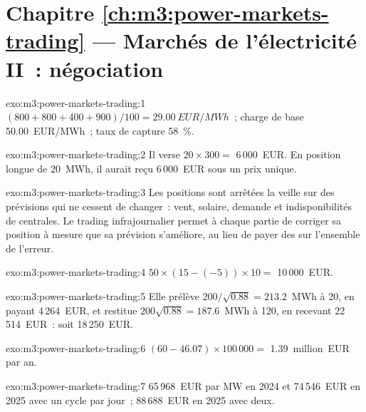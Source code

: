 \section*{Chapitre \ref{ch:m3:power-markets-trading} --- Marchés de l'électricité II~: négociation}

\begin{solution}{exo:m3:power-markets-trading:1}
 $(800 + 800 + 400 + 900)/100 = \qty{29.00}{EUR/MWh}$~; charge de base
\qty{50.00}{EUR/MWh}~; taux de capture 58~\%.
\end{solution}

\begin{solution}{exo:m3:power-markets-trading:2}
Il verse $20 \times 300 = $ 6\,000~EUR. En position longue de 20~MWh, il aurait reçu 6\,000~EUR sous un
prix unique.
\end{solution}

\begin{solution}{exo:m3:power-markets-trading:3}
Les positions sont arrêtées la veille sur des prévisions qui ne cessent de changer~: vent, solaire, demande et
indisponibilités de centrales. Le trading infrajournalier permet à chaque partie de corriger sa position à mesure que sa prévision s'améliore,
au lieu de payer des  sur l'ensemble de l'erreur.
\end{solution}

\begin{solution}{exo:m3:power-markets-trading:4}
$50 \times (15 - (-5)) \times 10 = $ 10\,000~EUR.
\end{solution}

\begin{solution}{exo:m3:power-markets-trading:5}
Elle prélève $200/\sqrt{0.88} = 213.2$~MWh à \qty{20}{}, en payant 4\,264~EUR, et restitue
$200\sqrt{0.88} = 187.6$~MWh à \qty{120}{}, en recevant 22\,514~EUR~: soit 18\,250~EUR.
\end{solution}

\begin{solution}{exo:m3:power-markets-trading:6}
$(60 - 46.07) \times 100\,000 = $ 1.39~million~EUR par an.
\end{solution}

\begin{solution}{exo:m3:power-markets-trading:7}
65\,968~EUR par MW en 2024 et 74\,546~EUR en 2025 avec un cycle par jour~; 88\,688~EUR en 2025
avec deux.
\end{solution}

